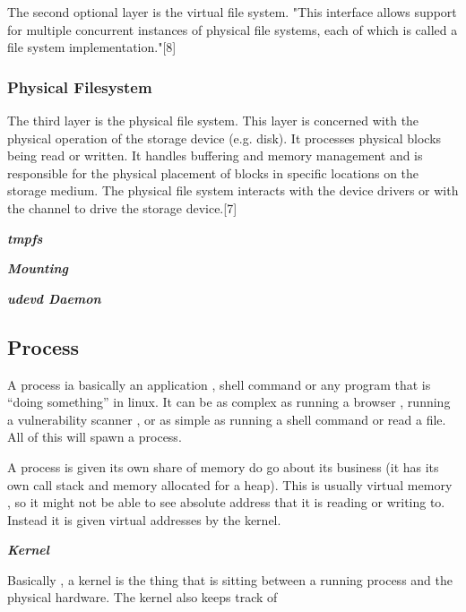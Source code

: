 The second optional layer is the virtual file system. "This interface allows
support for multiple concurrent instances of physical file systems, each of
which is called a file system implementation."[8]

\subsubsectionend

\subsubsection{Physical Filesystem}
\label{sssec:physical_filesystem}

The third layer is the physical file system. This layer is concerned with the
physical operation of the storage device (e.g. disk). It processes physical
blocks being read or written. It handles buffering and memory management and is
responsible for the physical placement of blocks in specific locations on the
storage medium. The physical file system interacts with the device drivers or
with the channel to drive the storage device.[7] 

\subsubsectionend


\textbf{\textit{tmpfs}}


\textbf{\textit{Mounting}}

\textbf{\textit{udevd Daemon}}



\subsectionend

\subsection{Process}
\label{ssec:process}

A process ia basically an application , shell command or any program that is
``doing something'' in linux. It can be as complex as running a browser ,
running a vulnerability scanner , or as simple as running a shell command or
read a file. All of this will spawn a process.

A process is given its own share of memory do go about its business (it has its
own call stack and memory allocated for a heap). This is usually virtual memory
, so it might not be able to see absolute address that it is reading or writing
to. Instead it is given virtual addresses by the kernel.

\textbf{\textit{Kernel}}

Basically , a kernel is the thing that is sitting between a running process and
the physical hardware.  The kernel also keeps track of

